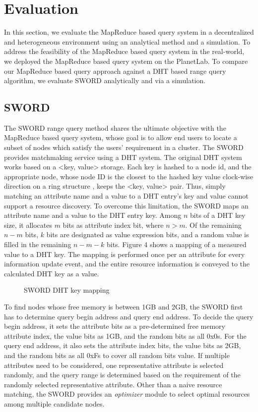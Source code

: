 \documentclass{acm_proc_article-sp}
\begin{document}
\section{Evaluation}
In this section, we evaluate the MapReduce based query system in a decentralized and heterogeneous environment using an analytical method and a simulation. 
To address the feasibility of the MapReduce based query system in the real-world, we deployed the MapReduce based query system on the PlanetLab. 
To compare our MapReduce based query approach against a DHT based range query algorithm, we evaluate SWORD\cite{sword} analytically and via a simulation.
\subsection{SWORD}
The SWORD range query method shares the ultimate objective with the MapReduce based query system, whose goal is to allow end users to locate a subset of nodes which satisfy the users' requirement in a cluster.
The SWORD provides matchmaking service using a DHT system. The original DHT system works based on a <key, value> storage. 
Each key is hashed to a node id, and the appropriate node, whose node ID is the closest to the hashed key value clock-wise direction on a ring structure\cite{chord} \cite{pastry}, keeps the <key, value> pair. 
Thus, simply matching an attribute name and a value to a DHT entry's key and value cannot support a resource discovery. 
To overcome this limitation, the SWORD maps an attribute name and a value to the DHT entry key. Among $n$ bits of a DHT key size, it allocates $m$ bits as attribute index bit, where $n>m$. 
Of the remaining $n-m$ bits, $k$ bits are designated as value expression bits, and a random value is filled in the remaining $n-m-k$ bits. Figure 4 shows a mapping of a measured value to a DHT key.
The mapping is performed once per an attribute for every information update event, and the entire resource information is conveyed to the calculated DHT key as a value.
\begin{figure}
\centering
{}
\caption{SWORD DHT key mapping}
\end{figure}
To find nodes whose free memory is between 1GB and 2GB, the SWORD first has to determine query begin address and query end address. 
To decide the query begin address, it sets the attribute bits as a pre-determined free memory attribute index, the value bits as 1GB, and the random bits as all 0x0s.
For the query end address, it also sets the attribute index bits, the value bits as 2GB, and the random bits as all 0xFs to cover all random bits value. 
If multiple attributes need to be considered, one representative attribute is selected randomly, and the query range is determined based on the requirement of the randomly selected representative attribute.
Other than a naive resource matching, the SWORD provides an \textit{optimizer} module to select optimal resources among multiple candidate nodes. 
\end{document}
